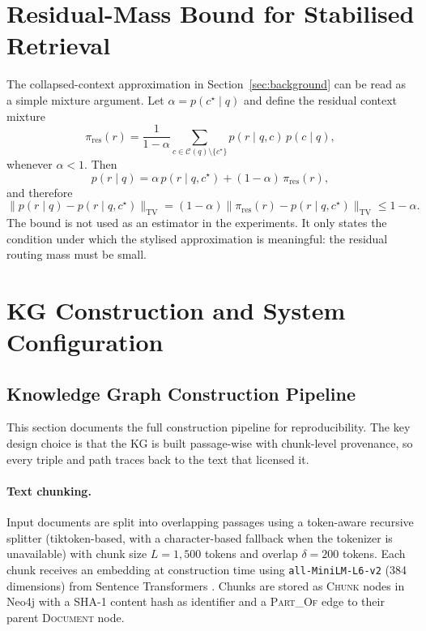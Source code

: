 \section{Residual-Mass Bound for Stabilised Retrieval}
\label{sec:appendix_residual_bound}

The collapsed-context approximation in Section~\ref{sec:background} can be
read as a simple mixture argument.
Let $\alpha = p(c^\star \mid q)$ and define the residual context mixture
\[
  \pi_{\mathrm{res}}(r)
  =
  \frac{1}{1-\alpha}
  \sum_{c \in \mathcal{C}(q)\setminus\{c^\star\}}
  p(r \mid q,c)\,p(c\mid q),
\]
whenever $\alpha < 1$.
Then
\[
  p(r\mid q)
  =
  \alpha\,p(r\mid q,c^\star)
  +
  (1-\alpha)\,\pi_{\mathrm{res}}(r),
\]
and therefore
\[
  \bigl\|p(r\mid q)-p(r\mid q,c^\star)\bigr\|_{\mathrm{TV}}
  =
  (1-\alpha)
  \bigl\|\pi_{\mathrm{res}}(r)-p(r\mid q,c^\star)\bigr\|_{\mathrm{TV}}
  \leq 1-\alpha.
\]
The bound is not used as an estimator in the experiments.
It only states the condition under which the stylised approximation is
meaningful: the residual routing mass must be small.

\section{KG Construction and System Configuration}
\label{sec:appendix_construction}

\subsection{Knowledge Graph Construction Pipeline}
\label{sec:appendix_kg}

This section documents the full construction pipeline for reproducibility.
The key design choice is that the KG is built passage-wise with chunk-level
provenance, so every triple and path traces back to the text that licensed it.

\paragraph{Text chunking.}
Input documents are split into overlapping passages using a token-aware
recursive splitter (tiktoken-based, with a character-based fallback when the
tokenizer is unavailable) with chunk size $L = 1{,}500$ tokens and overlap
$\delta = 200$ tokens.
Each chunk receives an embedding at construction time using
\texttt{all-MiniLM-L6-v2} (384 dimensions) from Sentence Transformers
\citep{reimers2019sentencebert}.
Chunks are stored as \textsc{Chunk} nodes in Neo4j with a SHA-1 content
hash as identifier and a \textsc{Part\_Of} edge to their parent
\textsc{Document} node.

